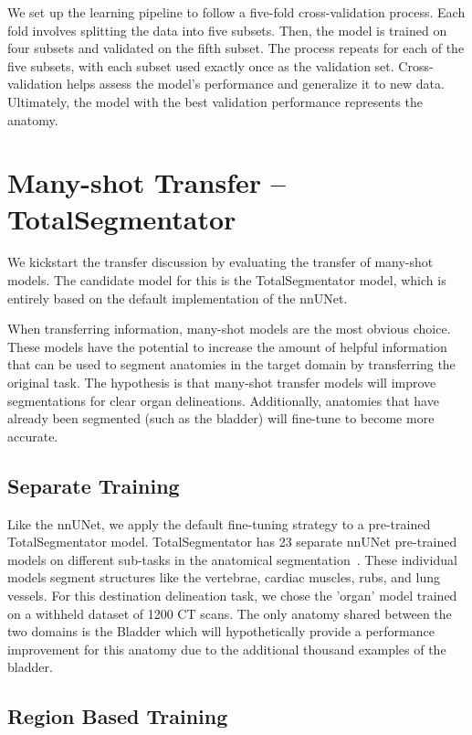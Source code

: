 \documentclass[12pt,twoside]{report}
\begin{document}
We set up the learning pipeline to follow a five-fold cross-validation process. Each fold involves splitting the data into five subsets. Then, the model is trained on four subsets and validated on the fifth subset. The process repeats for each of the five subsets, with each subset used exactly once as the validation set. Cross-validation helps assess the model's performance and generalize it to new data. Ultimately, the model with the best validation performance represents the anatomy.

\section{Many-shot Transfer -- TotalSegmentator}

We kickstart the transfer discussion by evaluating the transfer of many-shot models. The candidate model for this is the TotalSegmentator model, which is entirely based on the default implementation of the nnUNet. 

When transferring information, many-shot models are the most obvious choice. These models have the potential to increase the amount of helpful information that can be used to segment anatomies in the target domain by transferring the original task. The hypothesis is that many-shot transfer models will improve segmentations for clear organ delineations. Additionally, anatomies that have already been segmented (such as the bladder) will fine-tune to become more accurate.

\subsection{Separate Training}

Like the nnUNet, we apply the default fine-tuning strategy to a pre-trained TotalSegmentator model. TotalSegmentator has 23 separate nnUNet pre-trained models on different sub-tasks in the anatomical segmentation~\cite{totalsegmentor-git}. These individual models segment structures like the vertebrae, cardiac muscles, rubs, and lung vessels. For this destination delineation task, we chose the 'organ' model trained on a withheld dataset of 1200 CT scans. The only anatomy shared between the two domains is the Bladder which will hypothetically provide a performance improvement for this anatomy due to the additional thousand examples of the bladder.

\subsection{Region Based Training}
\end{document}
